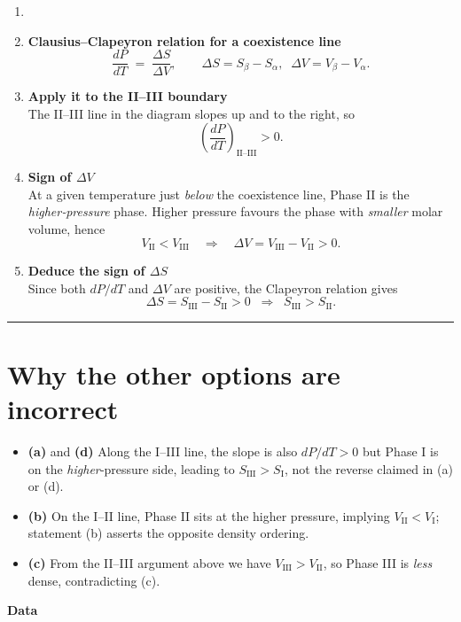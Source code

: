 \documentclass[12pt]{article}
\theoremstyle{definition} %
\theoremstyle{plain} %
\begin{document}
\begin{enumerate}
\item[]%
\item \textbf{Clausius–Clapeyron relation for a coexistence line}
      \[
        \frac{dP}{dT}\;=\;\frac{\Delta S}{\Delta V},
        \qquad
        \Delta S = S_\beta - S_\alpha,\;\;
        \Delta V = V_\beta - V_\alpha .
      \]

\item \textbf{Apply it to the II--III boundary}\\[2pt]
      The II--III line in the diagram slopes up and to the right, so
      \[
        \left(\frac{dP}{dT}\right)_{\mathrm{II\text{--}III}} > 0.
      \]

\item \textbf{Sign of \(\Delta V\)}\\[2pt]
      At a given temperature just \emph{below} the coexistence line,
      Phase II is the \emph{higher‑pressure} phase.
      Higher pressure favours the phase with \emph{smaller} molar
      volume, hence
      \[
        V_{\mathrm{II}} < V_{\mathrm{III}}
        \quad\Longrightarrow\quad
        \Delta V = V_{\mathrm{III}} - V_{\mathrm{II}} > 0.
      \]

\item \textbf{Deduce the sign of \(\Delta S\)}\\[2pt]
      Since both \(dP/dT\) and \(\Delta V\) are positive,
      the Clapeyron relation gives
      \[
        \Delta S = S_{\mathrm{III}} - S_{\mathrm{II}} > 0
        \;\;\Longrightarrow\;\;
        S_{\mathrm{III}} > S_{\mathrm{II}} .
      \]
\end{enumerate}

\bigskip
\hrule
\bigskip

\section*{Why the other options are incorrect}

\begin{itemize}
  \item \textbf{(a)} and \textbf{(d)}  
        Along the I--III line, the slope is also
        \(dP/dT>0\) but Phase I is on the \emph{higher}‑pressure side,
        leading to \(S_{\mathrm{III}} > S_{\mathrm{I}}\),
        not the reverse claimed in (a) or (d).

  \item \textbf{(b)}  
        On the I--II line, Phase II sits at the higher pressure,
        implying \(V_{\mathrm{II}}<V_{\mathrm{I}}\);
        statement (b) asserts the opposite density ordering.

  \item \textbf{(c)}  
        From the II--III argument above we have
        \(V_{\mathrm{III}} > V_{\mathrm{II}}\),
        so Phase III is \emph{less} dense, contradicting (c).
\end{itemize}
\textbf{Data}
\end{document}
